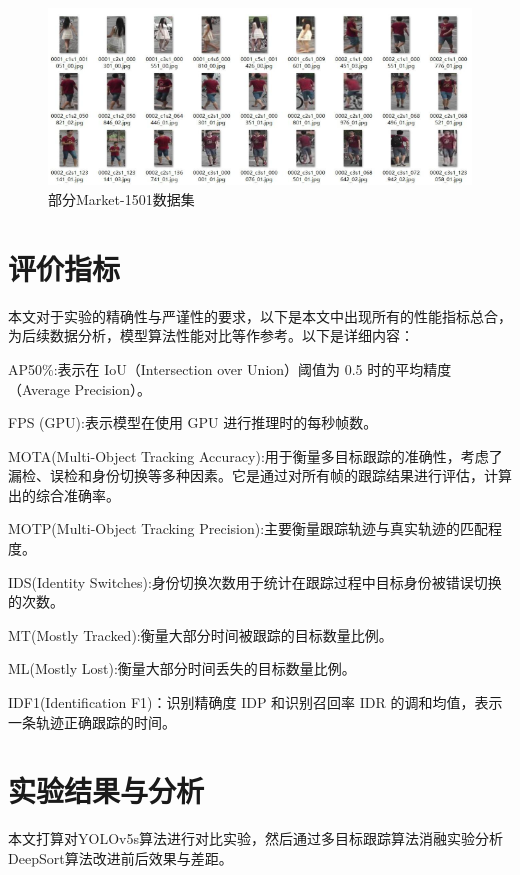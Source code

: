 \begin{figure}[htbp] %
	\centering
	\includegraphics[width=1\textwidth]{np10} %
	\caption{部分Market-1501数据集} %
	\label{fig:np10} %
\end{figure}




\section{评价指标}
本文对于实验的精确性与严谨性的要求，以下是本文中出现所有的性能指标总合，为后续数据分析，模型算法性能对比等作参考。以下是详细内容：




AP50\%:表示在 IoU（Intersection over Union）阈值为 0.5 时的平均精度（Average Precision）。

FPS (GPU):表示模型在使用 GPU 进行推理时的每秒帧数。

MOTA(Multi-Object Tracking Accuracy):用于衡量多目标跟踪的准确性，考虑了漏检、误检和身份切换等多种因素。它是通过对所有帧的跟踪结果进行评估，计算出的综合准确率。

MOTP(Multi-Object Tracking Precision):主要衡量跟踪轨迹与真实轨迹的匹配程度。

IDS(Identity Switches):身份切换次数用于统计在跟踪过程中目标身份被错误切换的次数。

MT(Mostly Tracked):衡量大部分时间被跟踪的目标数量比例。

ML(Mostly Lost):衡量大部分时间丢失的目标数量比例。

IDF1(Identification F1)：识别精确度 IDP 和识别召回率 IDR 的调和均值，表示一条轨迹正确跟踪的时间。

\section{实验结果与分析}
本文打算对YOLOv5s算法进行对比实验，然后通过多目标跟踪算法消融实验分析DeepSort算法改进前后效果与差距。

